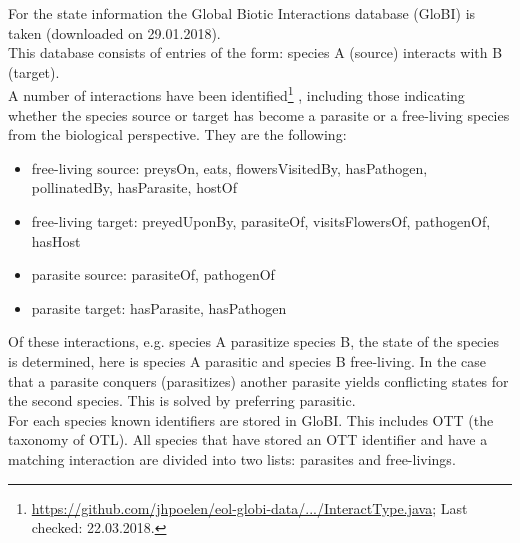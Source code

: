     For the state information the Global Biotic Interactions database (GloBI) is taken 
      \cite{Poelen2014} (downloaded on 29.01.2018). \\
    This database consists of entries of the form: species A (source) interacts with B (target). \\
    A number of interactions have been identified\footnote{\hyperlink{
      https://github.com/jhpoelen/eol-globi-data/blob/master/eol-globi-lib/src/main/java/org/eol/globi/domain/InteractType.java
      }{https://github.com/jhpoelen/eol-globi-data/.../InteractType.java}; Last checked: 22.03.2018.}
      , including those indicating whether the species source or target has become a parasite or a 
      free-living species from the biological perspective. They are the following:
    \begin{itemize}
      \item free-living source: preysOn, eats, flowersVisitedBy, hasPathogen, pollinatedBy, 
        hasParasite, hostOf
      \item free-living target: preyedUponBy, parasiteOf, visitsFlowersOf, pathogenOf, hasHost
      \item parasite source: parasiteOf, pathogenOf
      \item parasite target: hasParasite, hasPathogen
    \end{itemize}
    Of these interactions, e.g. species A parasitize species B, the state of the species is 
      determined, here is species A parasitic and species B free-living. In the case that a parasite 
      conquers (parasitizes) another parasite yields conflicting states for the second species. 
      This is solved by preferring parasitic. \\
    For each species known identifiers are stored in GloBI. This includes OTT (the taxonomy of OTL). 
      All species that have stored an OTT identifier and have a matching interaction are divided into 
      two lists: parasites and free-livings.

